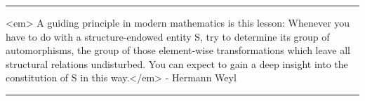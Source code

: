 \par\noindent\rule{\textwidth}{0.4pt}
<em>
A guiding principle in modern mathematics is this lesson: Whenever you 
have to do with a structure-endowed entity S, try to determine its group 
of automorphisms, the group of those element-wise transformations which 
leave all structural relations undisturbed.  You can expect to gain a 
deep insight into the constitution of S in this way.</em> - Hermann Weyl
 

\par\noindent\rule{\textwidth}{0.4pt}

